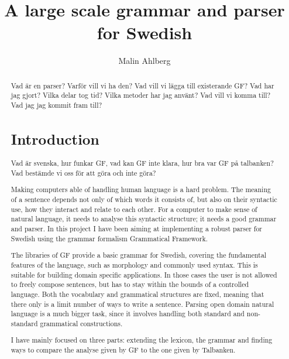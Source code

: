 \documentclass{article}
\title{A large scale grammar and parser for Swedish}
\author{Malin Ahlberg
\institute{Department of Computer Science \& Engineering, Gothenburg University, Sweden}
}
\begin{document}
\maketitle

\begin{abstract}
Vad är en parser? Varför vill vi ha den? Vad vill vi lägga till existerande GF?
Vad har jag gjort? Vilka delar tog tid? Vilka metoder har jag använt?
Vad vill vi komma till? Vad jag jag kommit fram till?


\section{Introduction}
Vad är svenska, hur funkar GF, vad kan GF inte klara, hur bra var GF
på talbanken? 
Vad bestämde vi oss för att göra och inte göra?

Making computers able of handling human language is a 
hard problem.
The meaning of a sentence depends not only of which words it consists of, but
also on their syntactic use, how they interact and relate to each other.
For a computer to make sense of natural language, it needs to analyse this 
syntactic structure; it needs a good grammar and parser.
In this project I have been aiming at implementing a robust parser for Swedish
using the grammar formalism Grammatical Framework. %

The libraries of GF provide a basic grammar for Swedish, covering the
fundamental features of the language, such as morphology and commonly used
syntax. This is suitable for building domain specific applications. In those
cases the user is not allowed to freely compose sentences, but has to stay
within the bounds of a controlled language. Both the vocabulary and grammatical
structures are fixed, meaning that there only is a limit number of ways to
write a sentence.  Parsing open domain natural language is a much bigger task,
since it involves handling both standard and non-standard grammatical
constructions. 

I have mainly focused on three parts: extending the lexicon, the grammar and
finding ways to compare the analyse given by GF to the one given by Talbanken. 



\end{abstract}
\end{document}
